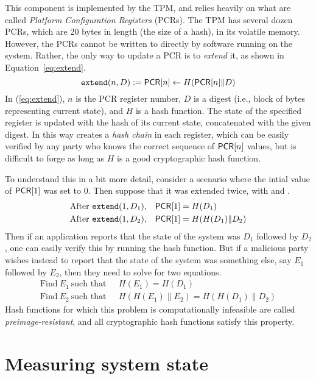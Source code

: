 \documentclass[11pt,twoside]{scrartcl}
\begin{document}
This component is implemented by the TPM, and relies heavily on what are called \emph{Platform Configuration Registers} (PCRs). The TPM has several dozen PCRs, which are 20 bytes in length (the size of a hash), in its volatile memory. However, the PCRs cannot be written to directly by software running on the system. Rather, the only way to update a PCR is to \emph{extend} it, as shown in Equation~\ref{eq:extend}.
\begin{equation}
\label{eq:extend}
\extend{n}{D} \eqdef \pcr[n] \gets H(\pcr[n] \| D)
\end{equation}
In (\ref{eq:extend}), $n$ is the PCR register number, $D$ is a digest (i.e., block of bytes representing current state), and $H$ is a hash function. The state of the specified register is updated with the hash of its current state, concatenated with the given digest. In this way \extend{\cdot} creates a \emph{hash chain} in each register, which can be easily verified by any party who knows the correct sequence of $\mathsf{PCR}[n]$ values, but is difficult to forge as long as $H$ is a good cryptographic hash function.

To understand this in a bit more detail, consider a scenario where the intial value of $\mathsf{PCR}[1]$ was set to 0. Then suppose that it was extended twice, with  and .
\begin{align*}
\text{After}~\texttt{\upshape extend}(1,D_1),\ \ \  & \mathsf{PCR}[1] = H(D_1) \\
\text{After}~\texttt{\upshape extend}(1,D_2),\ \ \  & \mathsf{PCR}[1] = H(H(D_1) \| D_2)
\end{align*}
Then if an application reports that the state of the system was $D_1$ followed by $D_2$, one can easily verify this by running the hash function. But if a malicious party wishes instead to report that the state of the system was something else, say $E_1$ followed by $E_2$, then they need to solve for two equations.
\begin{align*}
\text{Find}~E_1~\text{such that}\ \ \  & H(E_1) = H(D_1) \\
\text{Find}~E_2~\text{such that}\ \ \  & H(H(E_1) \| E_2) = H(H(D_1) \| D_2)
\end{align*}
Hash functions for which this problem is computationally infeasible are called \emph{preimage-resistant}, and all cryptographic hash functions satisfy this property.

\section{Measuring system state}
\end{document}
